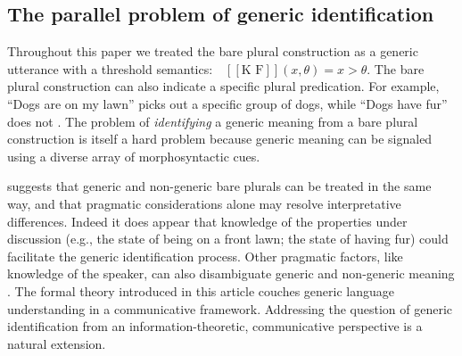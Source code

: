 \documentclass[12pt,letterpaper]{article}
\newcommand{\denote}[1]{\mbox{ $[\![ #1 ]\!]$}}
\begin{document}
\subsection*{The parallel problem of generic identification}

Throughout this paper we treated the bare plural construction as a generic utterance with a threshold semantics: $\denote{\text{K F}}(x, \theta)=x>\theta$.
The bare plural construction can also indicate a specific plural predication.
For example, ``Dogs are on my lawn'' picks out a specific group of dogs, while ``Dogs have fur''  does not \cite{Carlson1977}.
The problem of \emph{identifying} a generic meaning from a bare plural construction is itself a hard problem because generic meaning can be signaled using a diverse array of morphosyntactic cues.

 suggests that generic and non-generic bare plurals can be treated in the same way, and that pragmatic considerations alone may resolve interpretative differences. 
Indeed it does appear that knowledge of the properties under discussion (e.g., the state of being on a front lawn; the state of having fur) could facilitate the generic identification process.
Other pragmatic factors, like knowledge of the speaker, can also disambiguate generic and non-generic meaning \cite{Cimpian2008}.
The formal theory introduced in this article couches generic language understanding in a communicative framework.
Addressing the question of generic identification from an information-theoretic, communicative perspective is a natural extension.


\end{document}
